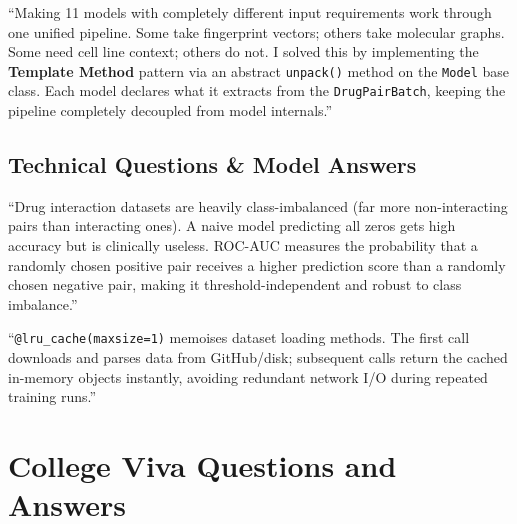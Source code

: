 \documentclass[12pt,a4paper,oneside]{article}
\begin{document}
\begin{tcolorbox}[questionbox,title={Q2: What was your biggest technical challenge?}]
\end{tcolorbox}
\begin{tcolorbox}[answerbox]
``Making 11 models with completely different input requirements work through one unified pipeline. Some take fingerprint vectors; others take molecular graphs. Some need cell line context; others do not. I solved this by implementing the \textbf{Template Method} pattern via an abstract \texttt{unpack()} method on the \texttt{Model} base class. Each model declares what it extracts from the \texttt{DrugPairBatch}, keeping the pipeline completely decoupled from model internals.''
\end{tcolorbox}

\subsection{Technical Questions & Model Answers}

\begin{tcolorbox}[questionbox,title={Q3: Why use ROC-AUC instead of Accuracy?}]
\end{tcolorbox}
\begin{tcolorbox}[answerbox]
``Drug interaction datasets are heavily class-imbalanced (far more non-interacting pairs than interacting ones). A naive model predicting all zeros gets high accuracy but is clinically useless. ROC-AUC measures the probability that a randomly chosen positive pair receives a higher prediction score than a randomly chosen negative pair, making it threshold-independent and robust to class imbalance.''
\end{tcolorbox}

\begin{tcolorbox}[questionbox,title={Q4: Explain \texttt{@lru\_cache} in your data loader.}]
\end{tcolorbox}
\begin{tcolorbox}[answerbox]
``\texttt{@lru\_cache(maxsize=1)} memoises dataset loading methods. The first call downloads and parses data from GitHub/disk; subsequent calls return the cached in-memory objects instantly, avoiding redundant network I/O during repeated training runs.''
\end{tcolorbox}

\section{College Viva Questions and Answers}\label{sec:viva}
\end{document}
